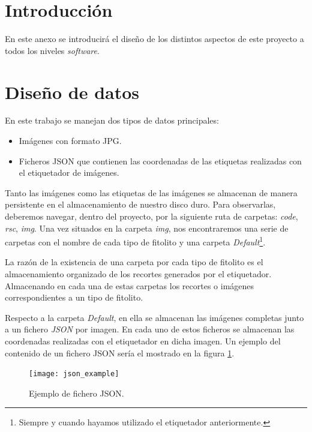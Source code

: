 
\section{Introducción}

En este anexo se introducirá el diseño de los distintos aspectos de este proyecto a todos los niveles \textit{software}.

\section{Diseño de datos}

En este trabajo se manejan dos tipos de datos principales:

\begin{itemize}
	\item Imágenes con formato JPG.
	\item Ficheros JSON que contienen las coordenadas de las etiquetas realizadas con el etiquetador de imágenes.
\end{itemize}

Tanto las imágenes como las etiquetas de las imágenes se almacenan de manera persistente en el almacenamiento de nuestro disco duro. Para observarlas, deberemos navegar, dentro del proyecto, por la siguiente ruta de carpetas: \textit{code}, \textit{rsc}, \textit{img}. Una vez situados en la carpeta \textit{img}, nos encontraremos una serie de carpetas con el nombre de cada tipo de fitolito y una carpeta \textit{Default}\footnote{Siempre y cuando hayamos utilizado el etiquetador anteriormente.}.

La razón de la existencia de una carpeta por cada tipo de fitolito es el almacenamiento organizado de los recortes generados por el etiquetador. Almacenando en cada una de estas carpetas los recortes o imágenes correspondientes a un tipo de fitolito. 

Respecto a la carpeta \textit{Default}, en ella se almacenan las imágenes completas junto a un fichero \textit{JSON} por imagen. En cada uno de estos ficheros se almacenan las coordenadas  realizadas con el etiquetador en dicha imagen. Un ejemplo del contenido de un fichero JSON sería el mostrado en la figura \ref{fig:C.1.1}.

\begin{figure}
\centering
\texttt{[image: json\_example]}
\caption{Ejemplo de fichero JSON.}
\label{fig:C.1.1}
\end{figure}

